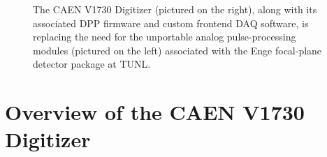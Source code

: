 \begin{figure}[t]
\caption{\label{fig:upgrade}The CAEN V1730 Digitizer (pictured on the right), along with its associated DPP firmware and custom frontend DAQ software, is replacing the need for the unportable analog pulse-processing modules (pictured on the left) associated with the Enge focal-plane detector package at TUNL.}
\end{figure}


\section{Overview of the CAEN V1730 Digitizer} \label{sec:digitizer} 

